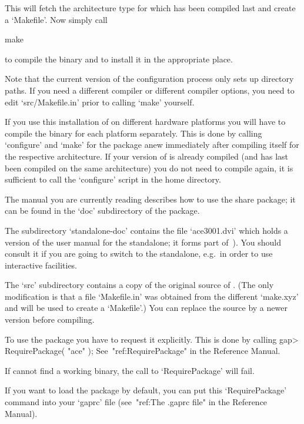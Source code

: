 This  will fetch  the  architecture  type for  which  {\GAP} has  been
compiled last and create a `Makefile'. Now simply call

\begintt
make
\endtt

to compile the binary and to install it in the appropriate place.

Note that the  current version of the configuration  process only sets
up  directory paths.  If you  need a  different compiler  or different
compiler options, you need  to edit `src/Makefile.in' prior to calling
`make' yourself.

If you use this installation of {\GAP} on different hardware platforms
you will have to compile the binary for each platform separately. This
is  done  by calling  `configure'  and  `make'  for the  package  anew
immediately   after  compiling  {\GAP}   itself  for   the  respective
architecture.  If your version of  {\GAP} is already compiled (and has
last  been compiled  on  the same  architecture)  you do  not need  to
compile {\GAP} again, it is  sufficient to call the `configure' script
in the {\GAP} home directory.

The manual you are currently reading describes how to use the   {\ACE}
share package; it can be found in the `doc' subdirectory of the package.

The subdirectory `standalone-doc' contains the file `ace3001.dvi' which
holds a version of the user manual for the {\ACE} standalone; it  forms
part of~\cite{HR99a}). You should consult it if you are going to switch
to the {\ACE} standalone, e.g.~in order to use interactive facilities.

The  `src' subdirectory  contains a  copy  of the  original source  of
{\ACE}.  (The  only modification  is  that  a  file `Makefile.in'  was
obtained from  the different `make.xyz' and  will be used  to create a
`Makefile'.)  You  can replace  the source by  a newer  version before
compiling.


To use  the {\ACE} package you  have to request it  explicitly. This is
done by calling
\begintt
gap> RequirePackage( "ace" );
\endtt
See~"ref:RequirePackage" in the {\GAP} Reference Manual.

If {\GAP} cannot find a working binary, the call to `RequirePackage' will
fail.

If you want to load the {\ACE} package by default, you can put this
`RequirePackage' command into your `gaprc' file
(see~"ref:The .gaprc file" in the {\GAP} Reference Manual).

